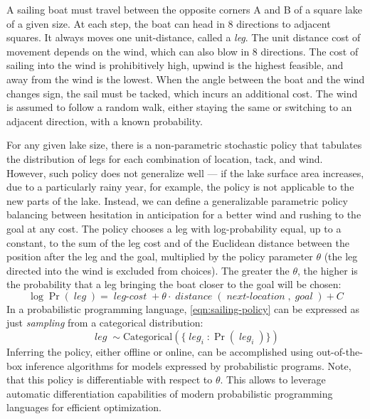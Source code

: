 \documentclass[letterpaper]{article} %
\newcommand{\var}[1]{{\operatorname{\mathit{#1}}}}
\theoremstyle{definition}
\begin{document}
A sailing boat must travel
between the opposite corners A and B of a square lake of a
given size. At each step, the boat can head in 8
directions to adjacent squares. It always moves one unit-distance, called a {\em leg}. The
unit distance cost of movement depends on the wind, which can
also blow in 8 directions.
The cost of sailing into the wind is prohibitively high, upwind
is the highest feasible, and away from the wind is the lowest.
When the angle between the boat and the wind changes sign, the
sail must be tacked, which incurs an additional cost.
The wind is assumed to follow a random walk, either
staying the same or switching to an adjacent
direction, with a known probability.

For any given lake size, there is a non-parametric stochastic policy
that tabulates the distribution of legs for each
combination of location, tack, and wind.
However, such policy does not
generalize well --- if the lake surface area increases, due to a
particularly rainy year, for example, the policy is not
applicable to the new parts of the lake. Instead, we
can define a generalizable parametric policy balancing between
hesitation in anticipation for a better wind and rushing to the
goal at any cost.  The policy chooses a leg with log-probability
equal, up to a constant, to the sum of the leg cost and of the Euclidean
distance between the position after the leg and the goal,
multiplied by the policy parameter $\theta$ (the leg directed
into the wind is excluded
from choices). The greater the $\theta$, the higher is the
probability that a leg bringing the boat closer to the goal will
be chosen:
\begin{equation}
    \log \Pr(\var{leg}) = \var{leg-cost} + \theta \cdot\var{distance}(\var{next-location}, \var{goal}) + C
	\label{eqn:sailing-policy}
\end{equation}
In a probabilistic programming language,
\eqref{eqn:sailing-policy} can be expressed as
just \textit{sampling} from a categorical distribution:
\begin{equation}
    \var{leg} \sim \mathrm{Categorical}(\{\var{leg}_i: \Pr(\var{leg}_i)\})
\end{equation}
Inferring the policy, either offline or online, can be
accomplished using out-of-the-box inference algorithms for
models expressed by probabilistic programs. Note, that this
policy is differentiable with respect to $\theta$. This allows
to leverage automatic differentiation capabilities of modern
probabilistic programming languages for efficient optimization.
\end{document}

